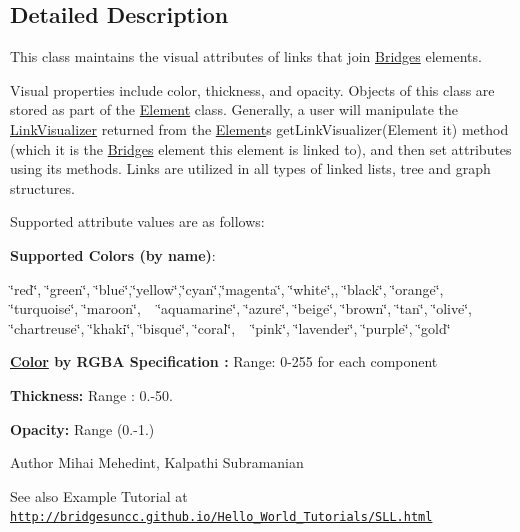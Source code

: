 \subsection{Detailed Description}
This class maintains the visual attributes of links that join \mbox{\hyperlink{namespace_bridges_1_1_bridges}{Bridges}} elements. 

Visual properties include color, thickness, and opacity. Objects of this class are stored as part of the \mbox{\hyperlink{namespace_bridges_1_1_element}{Element}} class. Generally, a user will manipulate the \mbox{\hyperlink{class_bridges_1_1_link_visualizer_1_1_link_visualizer}{Link\+Visualizer}} returned from the \mbox{\hyperlink{namespace_bridges_1_1_element}{Element}}\textquotesingle{}s get\+Link\+Visualizer(\+Element it) method (which it is the \mbox{\hyperlink{namespace_bridges_1_1_bridges}{Bridges}} element this element is linked to), and then set attributes using its methods. Links are utilized in all types of linked lists, tree and graph structures.

Supported attribute values are as follows\+:

{\bfseries Supported Colors (by name)}\+: 

\char`\"{}red\char`\"{}, \char`\"{}green\char`\"{}, \char`\"{}blue\char`\"{},\char`\"{}yellow\char`\"{},\char`\"{}cyan\char`\"{},\char`\"{}magenta\char`\"{}, \char`\"{}white\char`\"{},, \char`\"{}black\char`\"{}, \char`\"{}orange\char`\"{}, \char`\"{}turquoise\char`\"{}, \char`\"{}maroon\char`\"{}, ~\newline
 \char`\"{}aquamarine\char`\"{}, \char`\"{}azure\char`\"{}, \char`\"{}beige\char`\"{}, \char`\"{}brown\char`\"{}, \char`\"{}tan\char`\"{}, \char`\"{}olive\char`\"{}, \char`\"{}chartreuse\char`\"{}, \char`\"{}khaki\char`\"{}, \char`\"{}bisque\char`\"{}, \char`\"{}coral\char`\"{}, ~\newline
 \char`\"{}pink\char`\"{}, \char`\"{}lavender\char`\"{}, \char`\"{}purple\char`\"{}, \char`\"{}gold\char`\"{} 

{\bfseries  \mbox{\hyperlink{namespace_bridges_1_1_color}{Color}} by R\+G\+BA Specification \+:} Range\+: 0-\/255 for each component 

{\bfseries  Thickness\+: } Range \+: 0.-\/50.

{\bfseries  Opacity\+: } Range (0.-\/1.) 

\begin{DoxyAuthor}{Author}
Mihai Mehedint, Kalpathi Subramanian
\end{DoxyAuthor}
\begin{DoxySeeAlso}{See also}
Example Tutorial at ~\newline
 \href{http://bridgesuncc.github.io/Hello_World_Tutorials/SLL.html}{\tt http\+://bridgesuncc.\+github.\+io/\+Hello\+\_\+\+World\+\_\+\+Tutorials/\+S\+L\+L.\+html} 
\end{DoxySeeAlso}


